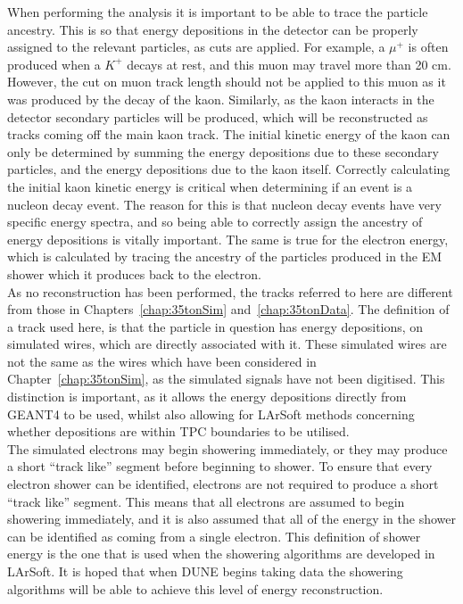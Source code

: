 When performing the analysis it is important to be able to trace the particle ancestry. This is so that energy depositions in the detector can be properly assigned to the relevant particles, as cuts are applied. For example, a $\mu^{+}$ is often produced when a $K^{+}$ decays at rest, and this muon may travel more than 20 cm. However, the cut on muon track length should not be applied to this muon as it was produced by the decay of the kaon. Similarly, as the kaon interacts in the detector secondary particles will be produced, which will be reconstructed as tracks coming off the main kaon track. The initial kinetic energy of the kaon can only be determined by summing the energy depositions due to these secondary particles, and the energy depositions due to the kaon itself. Correctly calculating the initial kaon kinetic energy is critical when determining if an event is a nucleon decay event. The reason for this is that nucleon decay events have very specific energy spectra, and so being able to correctly assign the ancestry of energy depositions is vitally important. The same is true for the electron energy, which is calculated by tracing the ancestry of the particles produced in the EM shower which it produces back to the electron. \\

As no reconstruction has been performed, the tracks referred to here are different from those in Chapters~\ref{chap:35tonSim} and~\ref{chap:35tonData}. The definition of a track used here, is that the particle in question has energy depositions, on simulated wires, which are directly associated with it. These simulated wires are not the same as the wires which have been considered in Chapter~\ref{chap:35tonSim}, as the simulated signals have not been digitised. This distinction is important, as it allows the energy depositions directly from GEANT4 to be used, whilst also allowing for LArSoft methods concerning whether depositions are within TPC boundaries to be utilised. \\

The simulated electrons may begin showering immediately, or they may produce a short ``track like'' segment before beginning to shower. To ensure that every electron shower can be identified, electrons are not required to produce a short ``track like'' segment. This means that all electrons are assumed to begin showering immediately, and it is also assumed that all of the energy in the shower can be identified as coming from a single electron. This definition of shower energy is the one that is used when the showering algorithms are developed in LArSoft. It is hoped that when DUNE begins taking data the showering algorithms will be able to achieve this level of energy reconstruction. \\

